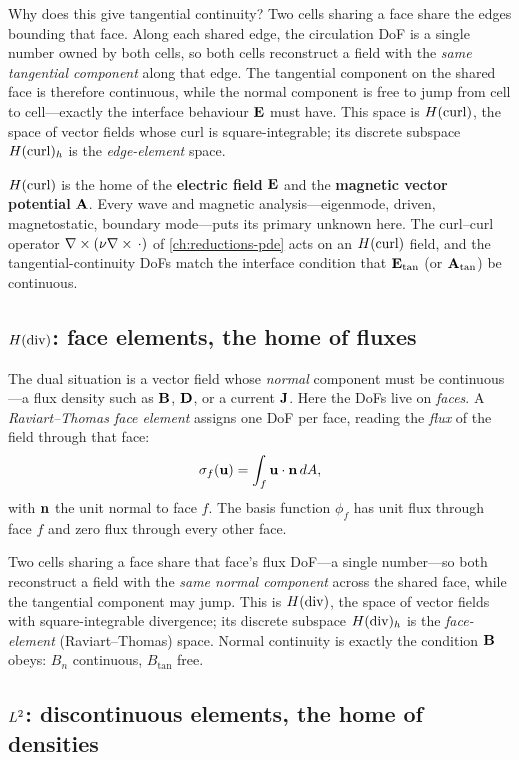 Why does this give tangential continuity? Two cells sharing a face share the edges
bounding that face. Along each shared edge, the circulation DoF is a single number
owned by both cells, so both cells reconstruct a field with the \emph{same
tangential component} along that edge. The tangential component on the shared face
is therefore continuous, while the normal component is free to jump from cell to
cell---exactly the interface behaviour $\mathbf{E}$ must have. This space is $H(\mathrm{curl})$, the
space of vector fields whose curl is square-integrable; its discrete subspace
$H(\mathrm{curl})_h$ is the \emph{edge-element} space.

\begin{physicsbox}
$H(\mathrm{curl})$ is the home of the \textbf{electric field} $\mathbf{E}$ and the \textbf{magnetic
vector potential} $\mathbf{A}$. Every wave and magnetic analysis---eigenmode, driven,
magnetostatic, boundary mode---puts its primary unknown here. The curl--curl
operator $\nabla\times(\nu\nabla\times\,\cdot)$ of \cref{ch:reductions-pde} acts on an $H(\mathrm{curl})$
field, and the tangential-continuity DoFs match the interface condition that
$\mathbf{E}_{\text{tan}}$ (or $\mathbf{A}_{\text{tan}}$) be continuous.
\end{physicsbox}

\subsection{$H(\mathrm{div})$: face elements, the home of fluxes}

The dual situation is a vector field whose \emph{normal} component must be
continuous---a flux density such as $\mathbf{B}$, $\mathbf{D}$, or a current $\mathbf{J}$. Here the DoFs
live on \emph{faces}. A \emph{Raviart--Thomas face element} assigns one DoF per face,
reading the \emph{flux} of the field through that face:
\[
  \sigma_f(\mathbf{u}) = \int_f \mathbf{u}\cdot\mathbf{n} \, dA,
\]
with $\mathbf{n}$ the unit normal to face $f$. The basis function $\phi_f$ has unit flux
through face $f$ and zero flux through every other face.

Two cells sharing a face share that face's flux DoF---a single number---so both
reconstruct a field with the \emph{same normal component} across the shared face,
while the tangential component may jump. This is $H(\mathrm{div})$, the space of vector fields
with square-integrable divergence; its discrete subspace $H(\mathrm{div})_h$ is the
\emph{face-element} (Raviart--Thomas) space. Normal continuity is exactly the
condition $\mathbf{B}$ obeys: $B_n$ continuous, $B_{\text{tan}}$ free.

\subsection{$L^2$: discontinuous elements, the home of densities}


